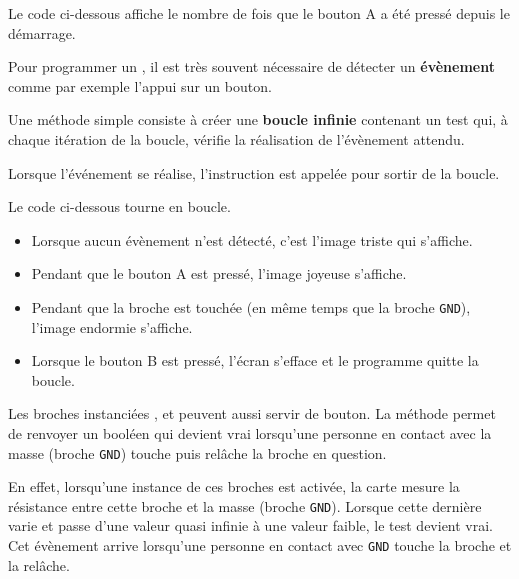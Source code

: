 \begin{methode}
Le code ci-dessous affiche le nombre de fois que le bouton A a été pressé depuis le démarrage.
\end{methode}

Pour programmer un \mb, il est très souvent nécessaire de détecter un \textbf{évènement} comme par exemple l'appui sur un bouton.\par
Une méthode simple consiste à créer une \textbf{boucle infinie}  contenant un test qui, à chaque itération de la boucle, vérifie la réalisation de l'évènement attendu.\par
Lorsque l'événement se réalise, l'instruction  est appelée pour sortir de la boucle.

\begin{methode}
Le code ci-dessous tourne en boucle.
\begin{itemize}
    \item Lorsque aucun évènement n'est détecté, c'est l'image triste  qui s'affiche.
    \item Pendant que le bouton A est pressé, l'image joyeuse  s'affiche.
    \item Pendant que la broche  est touchée (en même temps que la broche \texttt{GND}), l'image endormie  s'affiche.
    \item Lorsque le bouton B est pressé, l'écran s'efface et le programme quitte la boucle.
\end{itemize}

\end{methode}

\begin{remarque}
    Les broches instanciées ,  et  peuvent aussi servir de bouton. La méthode  permet de renvoyer un booléen qui devient vrai lorsqu'une personne en contact avec la masse (broche \texttt{GND}) touche puis relâche la broche en question.
    
    En effet, lorsqu'une instance de ces broches est activée, la carte \mb mesure la résistance entre cette broche et la masse (broche \texttt{GND}). Lorsque cette dernière varie et passe d'une valeur quasi infinie à une valeur faible, le test devient vrai. Cet évènement arrive lorsqu'une personne en contact avec \texttt{GND} touche la broche et la relâche.
\end{remarque}


